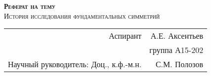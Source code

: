 
\begin{titlepage}
	\begin{center}
		
		
		\textsc{\textbf{Реферат на тему}}\\[2cm]
		
		\textsc{История исследования фундаментальных симметрий \\[2.4cm] }
		
		
	\end{center}
	
	
	\begin{flushright}
		\begin{tabular}{rr}
			Аспирант \underline{\hspace*{3cm}} & А.Е. Аксентьев \\
			&	группа А15-202 \\					
			Научный руководитель:          Доц., к.ф.-м.н. \underline{\hspace*{3cm}} & С.М. Полозов 	\\
		\end{tabular}
		
	\end{flushright}
	
	\vfill
	
	
	\begin{center}
		\the\year{}
	\end{center}
	
	
	
\end{titlepage}